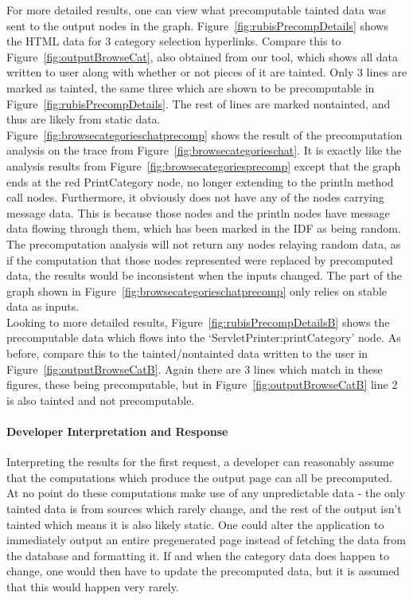 \documentclass[msc,oneside]{ubcthesis}
\begin{document}
For more detailed results, one can view what precomputable tainted data was sent to the output nodes in the graph. Figure~\ref{fig:rubisPrecompDetails} shows the HTML data for 3 category selection hyperlinks. Compare this to Figure~\ref{fig:outputBrowseCat}, also obtained from our tool, which shows all data written to user along with whether or not pieces of it are tainted. Only 3 lines are marked as tainted, the same three which are shown to be precomputable in Figure~\ref{fig:rubisPrecompDetails}. The rest of lines are marked nontainted, and thus are likely from static data. \\

Figure~\ref{fig:browsecategorieschatprecomp} shows the result of the precomputation analysis on the trace from Figure~\ref{fig:browsecategorieschat}. It is exactly like the analysis results from Figure~\ref{fig:browsecategoriesprecomp} except that the graph ends at the red PrintCategory node, no longer extending to the println method call nodes. Furthermore, it obviously does not have any of the nodes carrying message data. This is because those nodes and the println nodes have message data flowing through them, which has been marked in the IDF as being random. The precomputation analysis will not return any nodes relaying random data, as if the computation that those nodes represented were replaced by precomputed data, the results would be inconsistent when the inputs changed. The part of the graph shown in Figure~\ref{fig:browsecategorieschatprecomp} only relies on stable data as inputs.\\

Looking to more detailed results, Figure~\ref{fig:rubisPrecompDetailsB} shows the precomputable data which flows into the `ServletPrinter:printCategory' node. As before, compare this to the tainted/nontainted data written to the user in Figure~\ref{fig:outputBrowseCatB}. Again there are 3 lines which match in these figures, these being precomputable, but in Figure~\ref{fig:outputBrowseCatB} line 2 is also tainted and not precomputable.

\paragraph{Developer Interpretation and Response}

Interpreting the results for the first request, a developer can reasonably assume that the computations which produce the output page can all be precomputed. At no point do these computations make use of any unpredictable data - the only tainted data is from sources which rarely change, and the rest of the output isn't tainted which means it is also likely static. One could alter the application to immediately output an entire pregenerated page instead of fetching the data from the database and formatting it. If and when the category data does happen to change, one would then have to update the precomputed data, but it is assumed that this would happen very rarely.\\
\end{document}
